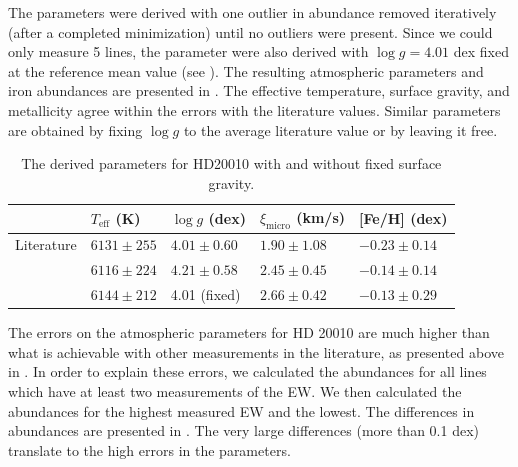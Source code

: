 The parameters were derived with one outlier in abundance removed iteratively (after a completed
minimization) until no outliers were present. Since we could only measure 5  lines, the
parameter were also derived with $\log g=4.01$ dex fixed at the reference mean value (see
). The resulting atmospheric parameters and iron abundances are presented in
. The effective temperature, surface gravity, and metallicity agree within
the errors with the literature values. Similar parameters are obtained by fixing $\log g$ to the
average literature value or by leaving it free.

\begin{table}[htb!]
    \caption{The derived parameters for HD20010 with and without fixed surface gravity.}
    \label{tab:HD20010_results}
    \centering
    \begin{tabular}{lllll}
      \hline\hline
                     & $T_\mathrm{eff}$ (K) &  $\log g$ (dex)  &   $\xi_\mathrm{micro}$ (km/s)  & [Fe/H] (dex)      \\
      \hline
        Literature   & $6131 \pm 255$       &  $4.01 \pm 0.60$ &    $1.90 \pm 1.08$              & $-0.23 \pm 0.14$ \\
      \hline
                     & $6116 \pm 224$       &  $4.21 \pm 0.58$ &    $2.45 \pm 0.45$              & $-0.14 \pm 0.14$ \\
                     & $6144 \pm 212$       &   4.01 (fixed)   &    $2.66 \pm 0.42$              & $-0.13 \pm 0.29$ \\
      \hline
    \end{tabular}
\end{table}


The errors on the atmospheric parameters for HD 20010 are much higher than what is achievable with
other measurements in the literature, as presented above in . In order to explain
these errors, we calculated the abundances for all lines which have at least two measurements of the
EW. We then calculated the abundances for the highest measured EW and the lowest. The differences in
abundances are presented in . The very large differences (more than 0.1
dex) translate to the high errors in the parameters.

